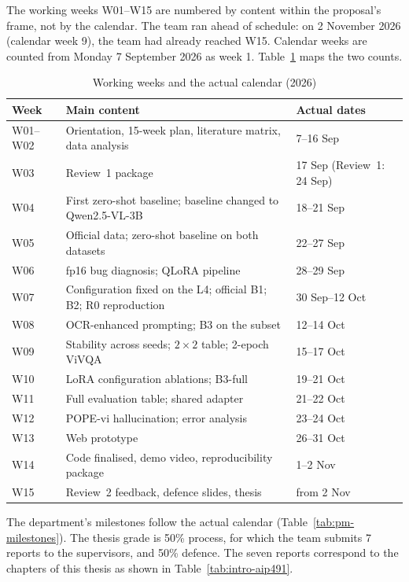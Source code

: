 The working weeks W01--W15 are numbered by content within the proposal's frame, not by the
calendar. The team ran ahead of schedule: on 2 November 2026 (calendar week 9), the team had
already reached W15. Calendar weeks are counted from Monday 7 September 2026 as week 1.
Table~\ref{tab:pm-weeks} maps the two counts.

\begin{table}[htbp]
\caption{Working weeks and the actual calendar (2026)}
\label{tab:pm-weeks}
\centering
\small
\begin{tabular}{p{}p{}p{}}
\toprule
\textbf{Week} & \textbf{Main content} & \textbf{Actual dates} \\
\midrule
W01--W02 & Orientation, 15-week plan, literature matrix, data analysis & 7--16 Sep \\
W03 & Review~1 package & 17 Sep (Review~1: 24 Sep) \\
W04 & First zero-shot baseline; baseline changed to Qwen2.5-VL-3B & 18--21 Sep \\
W05 & Official data; zero-shot baseline on both datasets & 22--27 Sep \\
W06 & fp16 bug diagnosis; QLoRA pipeline & 28--29 Sep \\
W07 & Configuration fixed on the L4; official B1; B2; R0 reproduction & 30 Sep--12 Oct \\
W08 & OCR-enhanced prompting; B3 on the subset & 12--14 Oct \\
W09 & Stability across seeds; $2\times2$ table; 2-epoch ViVQA & 15--17 Oct \\
W10 & LoRA configuration ablations; B3-full & 19--21 Oct \\
W11 & Full evaluation table; shared adapter & 21--22 Oct \\
W12 & POPE-vi hallucination; error analysis & 23--24 Oct \\
W13 & Web prototype & 26--31 Oct \\
W14 & Code finalised, demo video, reproducibility package & 1--2 Nov \\
W15 & Review~2 feedback, defence slides, thesis & from 2 Nov \\
\bottomrule
\end{tabular}
\end{table}

The department's milestones follow the actual calendar (Table~\ref{tab:pm-milestones}). The
thesis grade is 50\% process, for which the team submits 7 reports to the supervisors, and 50\% defence. The seven reports correspond to the chapters of this thesis as shown in Table~\ref{tab:intro-aip491}.

